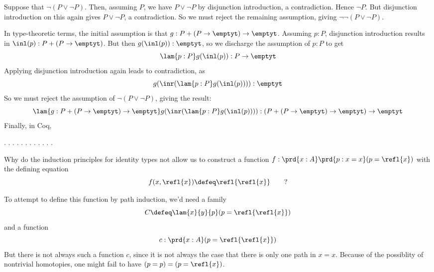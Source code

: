 \soln  
Suppose that $\lnot(P \lor \lnot P)$.  Then, assuming $P$, we have
$P \lor \lnot P$ by disjunction introduction, a contradiction.  Hence
$\lnot P$.  But disjunction introduction on this again gives $P \lor \lnot P$,
a contradiction.  So we must reject the remaining assumption, giving
$\lnot\lnot(P \lor \lnot P)$.


In type-theoretic terms, the initial assumption is that $g : P + (P \to
\emptyt) \to \emptyt$.  Assuming $p : P$, disjunction introduction results in
$\inl(p) : P + (P \to \emptyt)$.  But then $g(\inl(p)) : \emptyt$, so we
discharge the assumption of $p : P$ to get
\[
\lam{p:P}g(\inl(p)) : P \to \emptyt
\]
Applying disjunction introduction again leads to contradiction, as
\[
g(\inr(\lam{p:P}g(\inl(p)))) : \emptyt
\]
So we must reject the assumption of $\lnot( P \lor \lnot P)$, giving the
result:
\[
\lam{g:P + (P \to \emptyt) \to \emptyt}g(\inr(\lam{p:P}g(\inl(p)))) 
: 
(P + (P \to \emptyt) \to \emptyt) \to \emptyt
\]
Finally, in Coq, \begin{coqdoccode}
\coqdocemptyline
\coqdocindent{1.00em}
 \coqdocnotation{\ensuremath{\lnot}} \coqdocnotation{\ensuremath{\lnot}} \coqdocnotation{(}  \coqdocnotation{\ensuremath{\lnot}}\coqdocnotation{)}.\coqdoceol
\coqdocindent{1.00em}
.\coqdoceol
\coqdocindent{2.00em}
 .\coqdoceol
\coqdocindent{2.00em}
 .\coqdoceol
\coqdocindent{2.00em}
 .\coqdoceol
\coqdocindent{2.00em}
.\coqdoceol
\coqdocindent{2.00em}
 .\coqdoceol
\coqdocindent{2.00em}
 .\coqdoceol
\coqdocindent{2.00em}
.\coqdoceol
\coqdocindent{2.00em}
 .\coqdoceol
\coqdocindent{1.00em}
.\coqdoceol
\coqdocemptyline
\coqdocnoindent
{} .\coqdoceol
\coqdocemptyline
\end{coqdoccode}


Why do the induction principles for identity types not allow
us to construct a function $f : \prd{x:A}\prd{p:x=x}(p = \refl{x})$ with the
defining equation
\[
f(x, \refl{x}) \defeq \refl{\refl{x}}\qquad?
\] 

 \soln
To attempt to define this function by path induction, we'd need a
family
\[
  C \defeq \lam{x}{y}{p}(p = \refl{\refl{x}})
\]
and a function
\[
 c : \prd{x:A}(p = \refl{\refl{x}})
\]
But there is not always such a function $c$, since it is not always the case
that there is only one path in $x = x$.
Because of the possiblity of nontrivial homotopies, one might fail to have $(p = p) = (p = \refl{x})$.


